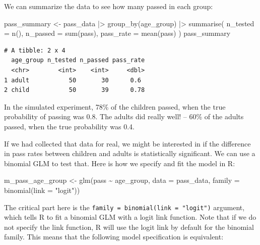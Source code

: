 \documentclass[
  letterpaper,
  8pt,
  a4paper]{book}
\newenvironment{Shaded}{\begin{snugshade}}{\end{snugshade}}
\newcommand{\AttributeTok}[1]{\textcolor[rgb]{0.40,0.45,0.13}{#1}}
\newcommand{\FunctionTok}[1]{\textcolor[rgb]{0.28,0.35,0.67}{#1}}
\newcommand{\NormalTok}[1]{\textcolor[rgb]{0.00,0.23,0.31}{#1}}
\newcommand{\OtherTok}[1]{\textcolor[rgb]{0.00,0.23,0.31}{#1}}
\newcommand{\SpecialCharTok}[1]{\textcolor[rgb]{0.37,0.37,0.37}{#1}}
\newcommand{\StringTok}[1]{\textcolor[rgb]{0.13,0.47,0.30}{#1}}
\begin{document}
We can summarize the data to see how many passed in each group:

\begin{Shaded}
\begin{Highlighting}[]
\NormalTok{pass\_summary }\OtherTok{\textless{}{-}}\NormalTok{ pass\_data }\SpecialCharTok{|\textgreater{}}
  \FunctionTok{group\_by}\NormalTok{(age\_group) }\SpecialCharTok{|\textgreater{}}
  \FunctionTok{summarise}\NormalTok{(}
    \AttributeTok{n\_tested =} \FunctionTok{n}\NormalTok{(),}
    \AttributeTok{n\_passed =} \FunctionTok{sum}\NormalTok{(pass),}
    \AttributeTok{pass\_rate =} \FunctionTok{mean}\NormalTok{(pass)}
\NormalTok{  )}
\NormalTok{pass\_summary}
\end{Highlighting}
\end{Shaded}

\begin{verbatim}
# A tibble: 2 x 4
  age_group n_tested n_passed pass_rate
  <chr>        <int>    <int>     <dbl>
1 adult           50       30      0.6 
2 child           50       39      0.78
\end{verbatim}

In the simulated experiment, 78\% of the children passed, when the true
probability of passing was 0.8. The adults did really well! -- 60\% of
the adults passed, when the true probability was 0.4.

If we had collected that data for real, we might be interested in if the
difference in pass rates between children and adults is statistically
significant. We can use a binomial GLM to test that. Here is how we
specify and fit the model in R:

\begin{Shaded}
\begin{Highlighting}[]
\NormalTok{m\_pass\_age\_group }\OtherTok{\textless{}{-}} \FunctionTok{glm}\NormalTok{(pass }\SpecialCharTok{\textasciitilde{}}\NormalTok{ age\_group, }\AttributeTok{data =}\NormalTok{ pass\_data, }\AttributeTok{family =} \FunctionTok{binomial}\NormalTok{(}\AttributeTok{link =} \StringTok{"logit"}\NormalTok{))}
\end{Highlighting}
\end{Shaded}

The critical part here is the
\texttt{family\ =\ binomial(link\ =\ "logit")} argument, which tells R
to fit a binomial GLM with a logit link function. Note that if we do not
specify the link function, R will use the logit link by default for the
binomial family. This means that the following model specification is
equivalent:
\end{document}
